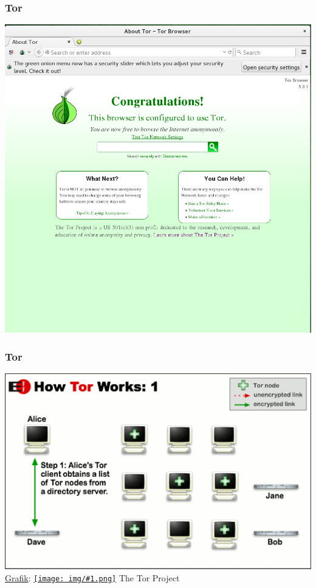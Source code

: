 \documentclass[12pt]{beamer}
\newcommand{\cc}[1]{\texttt{[image: img/\#1.png]}\hspace{1mm}}
\begin{document}
\begin{frame}
  \frametitle{Tor}
  \begin{center}
    \includegraphics[height=0.8\textheight]{img/torbrowser1.png}
  \end{center}
\end{frame}

\begin{frame}
    \frametitle{Tor}
    \includegraphics[height=0.7\textheight]{img/tor1.png}
    \\{\small \href{https://www.torproject.org/images/htw1.png}{Grafik}: \href{https://creativecommons.org/licenses/by/3.0/us/}{\cc{by}} The Tor Project}
\end{frame}
\end{document}
